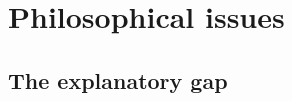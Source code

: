 \documentclass[10pt,a4paper,twoside,openany]{book}
\begin{document}





\chapter{Philosophical issues}
\label{Philosophical issues}

\section{The explanatory gap}
\end{document}
